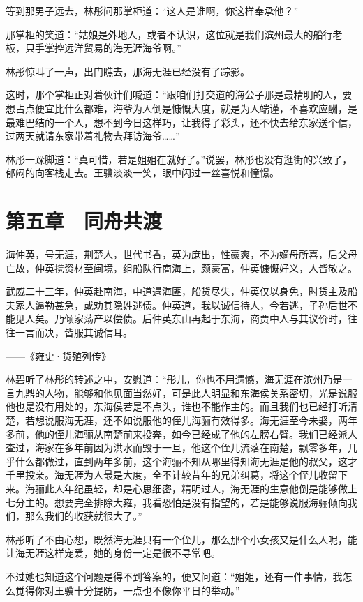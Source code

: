 等到那男子远去，林彤问那掌柜道：“这人是谁啊，你这样奉承他？”

那掌柜的笑道：“姑娘是外地人，或者不认识，这位就是我们滨州最大的船行老板，只手掌控远洋贸易的海无涯海爷啊。”

林彤惊叫了一声，出门瞧去，那海无涯已经没有了踪影。

这时，那个掌柜正对着伙计们喊道：“跟咱们打交道的海公子那是最精明的人，要想占点便宜比什么都难，海爷为人倒是慷慨大度，就是为人端谨，不喜欢应酬，是最难巴结的一个人，想不到今日这样巧，让我得了彩头，还不快去给东家送个信，过两天就请东家带着礼物去拜访海爷……”

林彤一跺脚道：“真可惜，若是姐姐在就好了。”说罢，林彤也没有逛街的兴致了，郁闷的向客栈走去。王骥淡淡一笑，眼中闪过一丝喜悦和憧憬。

\chapter{第五章　同舟共渡}

海仲英，号无涯，荆楚人，世代书香，英为庶出，性豪爽，不为嫡母所喜，后父母亡故，仲英携资材至闽境，组船队行商海上，颇豪富，仲英慷慨好义，人皆敬之。

武威二十三年，仲英赴南海，中道遇海匪，船货尽失，仲英仅以身免，时货主及船夫家人逼勒甚急，或劝其隐姓逃债。仲英道，我以诚信待人，今若逃，子孙后世不能见人矣。乃倾家荡产以偿债。后仲英东山再起于东海，商贾中人与其议价时，往往一言而决，皆服其诚信耳。

——《雍史·货殖列传》

林碧听了林彤的转述之中，安慰道：“彤儿，你也不用遗憾，海无涯在滨州乃是一言九鼎的人物，能够和他见面当然好，可是此人明显和东海侯关系密切，光是说服他也是没有用处的，东海侯若是不点头，谁也不能作主的。而且我们也已经打听清楚，若想说服海无涯，还不如说服他的侄儿海骊有效得多。海无涯至今未娶，两年多前，他的侄儿海骊从南楚前来投奔，如今已经成了他的左膀右臂。我们已经派人查过，海家在多年前因为洪水而毁于一旦，他这个侄儿流落在南楚，飘零多年，几乎什么都做过，直到两年多前，这个海骊不知从哪里得知海无涯是他的叔父，这才千里投亲。海无涯为人最是大度，全不计较昔年的兄弟纠葛，将这个侄儿收留下来。海骊此人年纪虽轻，却是心思细密，精明过人，海无涯的生意他倒是能够做上七分主的。想要完全排除大雍，我看恐怕是没有指望的，若是能够说服海骊倾向我们，那么我们的收获就很大了。”

林彤听了不由心想，既然海无涯只有一个侄儿，那么那个小女孩又是什么人呢，能让海无涯这样宠爱，她的身份一定是很不寻常吧。

不过她也知道这个问题是得不到答案的，便又问道：“姐姐，还有一件事情，我怎么觉得你对王骥十分提防，一点也不像你平日的举动。”

